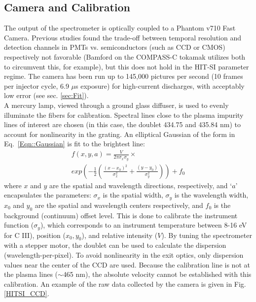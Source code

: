 	\subsection{Camera and Calibration}
	\hspace*{4ex}The output of the spectrometer is optically coupled to a Phantom v710 Fast Camera. Previous studies found the trade-off between temporal resolution and detection channels in PMTs vs. semiconductors (such as CCD or CMOS) respectively not favorable (Bamford\cite{bamford1992combination} on the COMPASS-C tokamak  utilizes both to circumvent this, for example), but this does not hold in the HIT-SI parameter regime. The camera has been run up to 145,000 pictures per second (10 frames per injector cycle, 6.9 $\mu$s exposure) for high-current discharges, with acceptably low error (see sec. \ref{sec:Fit}). \\
	\hspace*{4ex} A mercury lamp, viewed through a ground glass diffuser, is used to evenly illuminate the fibers for calibration. Spectral lines close to the plasma impurity lines of interest are chosen (in this case, the doublet 434.75 and 435.84 nm) to account for nonlinearity in the grating. An elliptical Gaussian of the form in Eq.~\ref{Eqn::Gaussian} is fit to the brightest line:
	\begin{eqnarray}\label{Eqn::Gaussian}
	f(x,y,a)=\frac{V}{2{\pi}\sigma_x\sigma_y}\times\nonumber\\ exp\left(-\frac{1}{2}\left(\frac{(x-x_0)^2}{\sigma_x^2}+\frac{(y-y_0)}{\sigma_y^2}\right)\right)+f_0
	\end{eqnarray}
	where $x$ and $y$ are the spatial and wavelength directions, respectively, and `$a$' encapsulates the parameters: ${\sigma}_x$ is the spatial width, ${\sigma}_y$ is the wavelength width, $x_0$ and $y_0$ are the spatial and wavelength centers respectively, and $f_0$ is the background (continuum) offset level. This is done to calibrate the instrument function ($\sigma_y$), which corresponds to an instrument temperature between 8-16 eV for C III), position ($x_0,y_0$), and relative intensity ($V$). By tuning the spectrometer with a stepper motor, the doublet can be used to calculate the dispersion (wavelength-per-pixel). To avoid nonlinearity in the exit optics, only dispersion values near the center of the CCD are used.  Because the calibration line is not at the plasma lines ($\sim$465 nm), the absolute velocity cannot be established with this calibration. An example of the raw data collected by the camera is given in Fig. \ref{HITSI_CCD}.
